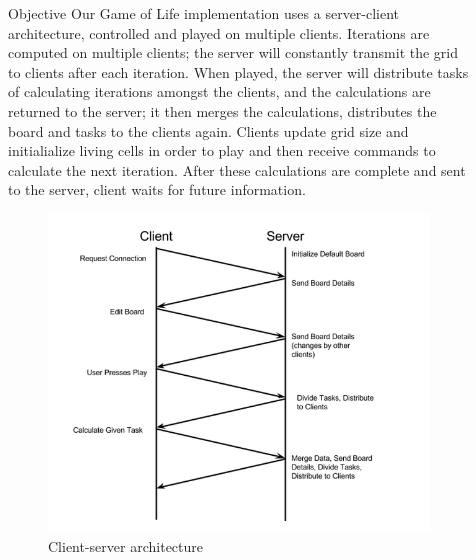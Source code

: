 \documentclass[final]{beamer}
\newlength{\sepwid}
\newlength{\onecolwid}
\newlength{\twocolwid}
\begin{document}
\begin{frame}[t]
\begin{columns}[t]
\begin{column}{\onecolwid}
\begin{block}{Objective}
	Our Game of Life implementation uses a server-client architecture, controlled and played on multiple clients. Iterations are computed on multiple clients; the server will constantly transmit the grid to clients after each iteration. When played, the server will distribute tasks of calculating iterations amongst the clients, and the calculations are returned to the server; it then merges the calculations, distributes the board and tasks to the clients again. Clients update grid size and initialialize living cells in order to play and then receive commands to calculate the next iteration. After these calculations are complete and sent to the server, client waits for future information.
\end{block}


\begin{figure}
\includegraphics[width=0.8\linewidth]{client_server_architecture.jpg}
\caption{Client-server architecture}
\end{figure}


\end{column} %

\begin{column}{\sepwid}\end{column} %

\begin{column}{\twocolwid} %


\end{column}
\end{columns}
\end{frame}
\end{document}

